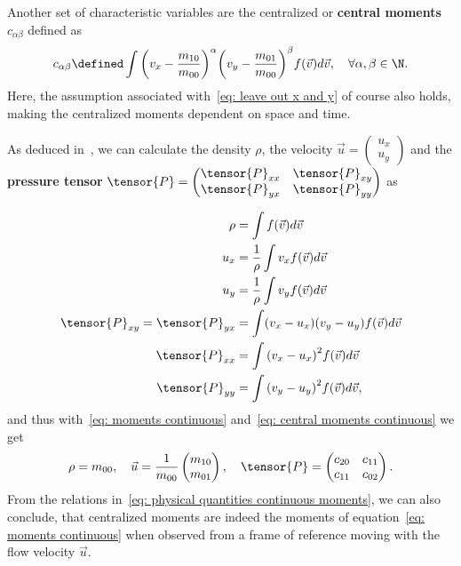 Another set of characteristic variables are the centralized or \textbf{central moments} $c_{\alpha\beta}$ defined as
\begin{equation}
  \label{eq: central moments continuous}
  c_{\alpha\beta} \defined \int {\left(v_x - \frac{m_{10}}{m_{00}}\right)}^\alpha {\left(v_y-\frac{m_{01}}{m_{00}}\right)}^\beta f(\vec{v})  d\vec{v},\quad\forall\alpha,\beta\in\N.
\end{equation}
Here, the assumption associated with~\eqref{eq: leave out x and y} of course also holds, making the centralized moments dependent on space and time.

As deduced in~\cite[pages 23 ff.]{harris2004introduction}, we can calculate the density $\rho$, the velocity $\vec{u}=\begin{pmatrix}u_x\\u_y\end{pmatrix}$ and the
\textbf{pressure tensor} $\tensor{P}=\begin{pmatrix}\tensor{P}_{xx}&\tensor{P}_{xy}\\ \tensor{P}_{yx}&\tensor{P}_{yy}\end{pmatrix}$ as

\begin{equation}
  \label{eq: physical quantities continuous}
  \begin{aligned}
    \rho & = \int f(\vec{v}) d\vec{v} \\
    u_x
    & = \frac{1}{\rho}\int v_x f(\vec{v}) d\vec{v} \\
    u_y
    & = \frac{1}{\rho}\int v_y f(\vec{v}) d\vec{v}\\
    \tensor{P}_{xy}=\tensor{P}_{yx}
    & = \int (v_x - u_x)(v_y - u_y) f(\vec{v}) d\vec{v} \\
    \tensor{P}_{xx}
    & = \int {(v_x - u_x)}^2 f(\vec{v}) d\vec{v} \\
    \tensor{P}_{yy}
    & = \int {(v_y - u_y)}^2 f(\vec{v}) d\vec{v},
  \end{aligned}
\end{equation}
and thus with~\eqref{eq: moments continuous} and~\eqref{eq: central moments continuous} we get
\begin{equation}
  \label{eq: physical quantities continuous moments}
\rho = m_{00}, \quad \vec{u}=\frac{1}{m_{00}}\begin{pmatrix}m_{10}\\m_{01}\end{pmatrix},\quad \tensor{P}=\begin{pmatrix}c_{20}&c_{11}\\ c_{11}&c_{02}\end{pmatrix}.
\end{equation}
From the relations in~\eqref{eq: physical quantities continuous moments}, we can also conclude, that centralized moments are indeed the moments of equation~\eqref{eq: moments continuous} when observed from a frame of reference moving with the flow velocity $\vec{u}$.

